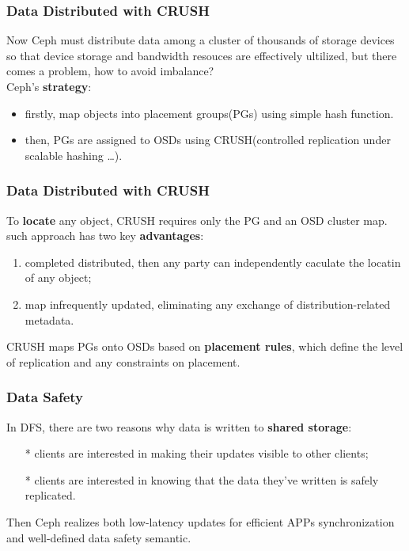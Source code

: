 \documentclass[cjk,slidestop,mathserif]{beamer}
\begin{document}
\begin{CJK}{UTF8}{gkai}
\begin{frame}
 \frametitle{Data Distributed with CRUSH}
 \vspace{12pt}
 Now Ceph must distribute data among a cluster of thousands of storage devices so that device storage and 
 bandwidth resouces are effectively ultilized, but there comes a problem, \alert{how to avoid imbalance?} \\
 \vspace{6pt}
 Ceph's \textbf{strategy}: \\
 \begin{itemize}
  \item firstly, map objects into placement groups(PGs) using simple hash function.
  \item then, PGs are assigned to OSDs using CRUSH(controlled replication under scalable hashing \ldots).
 \end{itemize}
\end{frame}

\begin{frame}
 \frametitle{Data Distributed with CRUSH}
 \vspace{6pt}
 To \textbf{locate} any object, CRUSH requires only the PG and an OSD cluster map.\\
 such approach has two key \textbf{advantages}:\\
 \begin{enumerate}
  \item completed distributed, then any party can independently caculate the locatin of any object;
  \item map infrequently updated, eliminating any exchange of distribution-related metadata.
 \end{enumerate}
 \vspace{4pt}
 CRUSH maps PGs onto OSDs based on \textbf{placement rules}, which define the level of replication and any constraints on placement.
\end{frame}

\begin{frame}
 \frametitle{Data Safety}
 \vspace{18pt}
 In DFS, there are two reasons why data is written to \textbf{shared storage}:\\
 \begin{itemize}
  \item[*] clients are interested in making their updates visible to other clients;
  \item[*] clients are interested in knowing that the data they've written is safely replicated.
 \end{itemize}
\vspace{4pt}
Then Ceph realizes both low-latency updates for efficient APPs synchronization and well-defined data safety semantic.
\end{frame}


\end{CJK}
\end{document}
